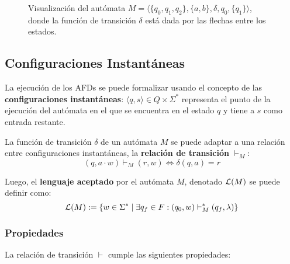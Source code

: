 \begin{figure}[H]
    \centering
    \caption*{Visualización del autómata $M = \langle \{q_0, q_1, q_2\}, \{a, b\}, \delta, q_0, \{q_1\} \rangle$, donde la función de transición $\delta$ está dada por las flechas entre los estados.}
\end{figure}

\subsection{Configuraciones Instantáneas}

La ejecución de los AFDs se puede formalizar usando el concepto de las \textbf{configuraciones instantáneas}: $\langle q, s \rangle \in Q \times \Sigma^*$ representa el punto de la ejecución del autómata en el que se encuentra en el estado $q$ y tiene a $s$ como entrada restante.

La función de transición $\delta$ de un autómata $M$ se puede adaptar a una relación entre configuraciones instantáneas, la \textbf{relación de transición} $\vdash_M$:
$$
(q, a \cdot w) \vdash_M (r, w) \iff \delta(q, a) = r
$$

Luego, el \textbf{lenguaje aceptado} por el autómata $M$, denotado $\mathcal{L}(M)$ se puede definir como:
$$
\mathcal{L}(M) := \{ w \in \Sigma^* \mid \exists q_f \in F : (q_0, w) \vdash_M^* (q_f, \lambda) \}
$$

\subsubsection{Propiedades}
\label{subsubsec-propiedades-rel-transicion}

La relación de transición $\vdash$ cumple las siguientes propiedades:

